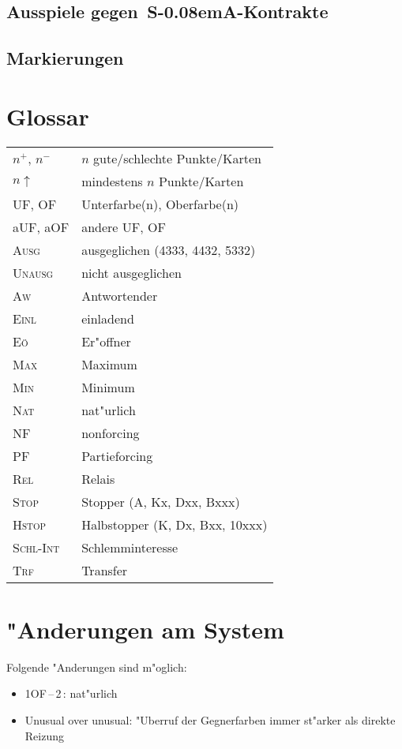 \documentclass[11pt,german,twocolumn]{scrartcl}
\renewcommand{\Cl}{{\color{ClColor}{$\clubsuit$}}}
\def\tre{\,\Cl}
\def\good{$^+$}
\def\bad{$^-$}
\def\pl{$\uparrow$}
\def\ufa{\textsf{UF}}
\def\aufa{\textsf{aUF}}
\def\ofa{\textsf{OF}}
\def\aofa{\textsf{aOF}}
\def\SA{\textsf{\,S\kern-0.08emA}}
\def\sep{\,--\,}
\def\bal{\textsc{Ausg}}
\def\unbal{\textsc{Unausg}}
\def\nat{\textsc{Nat}}
\def\pf{\textsc{PF}}
\def\maxi{\textsc{Max}}
\def\mini{\textsc{Min}}
\def\inv{\textsc{Einl}}
\def\nf{\textsc{NF}}
\def\rel{\textsc{Rel}}
\def\stp{\textsc{Stop}}
\def\hstp{\textsc{Hstop}}
\def\aw{\textsc{Aw}}
\def\eo{\textsc{E\"o}}
\def\xfer{\textsc{Trf}}
\def\slamint{\textsc{Schl-Int}}
\begin{document}
\subsection{Ausspiele gegen \SA-Kontrakte}

\subsection{Markierungen}

\begin{appendix}

\section{Glossar}

\begin{flushleft}
\begin{tabularx}{\columnwidth}{lX}%
$n$\good, $n$\bad & $n$ gute/schlechte Punkte/Karten \\
$n$\pl & mindestens $n$ Punkte/Karten \\
\ufa, \ofa & Unterfarbe(n), Oberfarbe(n) \\
\aufa, \aofa & andere \ufa, \ofa\\
\bal & ausgeglichen (4333, 4432, 5332)\\
\unbal & nicht ausgeglichen \\
\aw & Antwortender \\
\inv & einladend \\
\eo & Er"offner \\
\maxi & Maximum \\
\mini & Minimum \\
\nat & nat"urlich \\
\nf & nonforcing \\
\pf & Partieforcing \\
\rel & Relais \\
\stp & Stopper (A, Kx, Dxx, Bxxx) \\
\hstp & Halbstopper (K, Dx, Bxx, 10xxx) \\
\slamint & Schlemminteresse \\
\xfer & Transfer \\
\end{tabularx}%
\end{flushleft}

\section{"Anderungen am System}

Folgende "Anderungen sind m"oglich:
%
\begin{itemize}
\item 1\ofa\sep2\tre: nat"urlich
\item Unusual over unusual: "Uberruf der Gegnerfarben immer st"arker als direkte Reizung
\end{itemize}


\end{appendix}
\end{document}
